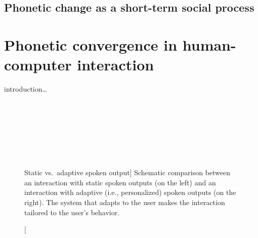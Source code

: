 
\subsection[Short-term phonetic change]{Phonetic change as a short-term social process}
\label{subsec:phonetic_change}


\section{Phonetic convergence in human-computer interaction}
\label{sec:phonetic_convergence_inh_ci}

introduction\ldots

\citet{Weise2018looking}\\%
\citet{Lewandowski2019phonetic}\\%
\citet{Xiao2015analyzing}\\%
\citet{Cohen2017converging}\\%
\citet{DeLooze2014investigating}\\%
\citet{Priva2019limitations}\\%

\begin{figure}[t]
	\centering
	\hfill %
	\caption
	[Static vs.\ adaptive spoken output]
	{Schematic comparison between an interaction with static spoken outputs (on the left) and an interaction with adaptive (i.e., personalized) spoken outputs (on the right).
		The system that adapts to the user makes the interaction tailored to the user's behavior.}
	\label{fig:output_comparison}
\end{figure}


